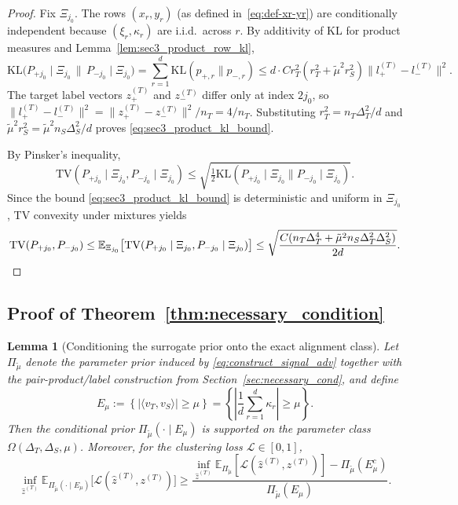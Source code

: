 \documentclass[10pt]{article}
\newtheorem{lemma}{Lemma}
\newcommand{\Ebb}{\mathbb E}
\newcommand{\ip}[2]{\langle #1,#2\rangle}
\newcommand{\wh}{\widehat}
\newcommand{\calL}{\mathcal L}
\newcommand{\KL}{\mathrm{KL}}
\newcommand{\TV}{\mathrm{TV}}
\newcommand{\trg}{T}
\newcommand{\nT}{n_{\trg}}
\newcommand{\ztar}{z^{(\trg)}}
\newcommand{\hatztar}{\wh{z}^{(\trg)}}
\newcommand{\DeltaT}{\Delta_{\trg}}
\newcommand{\src}{S}
\newcommand{\nS}{n_{\src}}
\newcommand{\DeltaS}{\Delta_{\src}}
\begin{document}
\begin{proof}
Fix $\Xi_{j_0}$.  The rows $(x_r,y_r)$ (as defined in~\eqref{eq:def-xr-yr}) are conditionally independent because
$(\xi_r,\kappa_r)$ are i.i.d.\ across $r$.  By additivity of KL for product
measures and Lemma~\ref{lem:sec3_product_row_kl},
\[
    \KL\!\bigl(P_{+j_0}\mid\Xi_{j_0}\,\big\|\,P_{-j_0}\mid\Xi_{j_0}\bigr)
    =
    \sum_{r=1}^d \KL(p_{+,r}\|p_{-,r})
    \le
    d\cdot Cr_T^2(r_T^2+\tilde\mu^2 r_S^2)\|l^{(\trg)}_+-l^{(\trg)}_-\|^2.
\]
The target label vectors $\ztar_+$ and $\ztar_-$ differ only at index $2j_0$,
so $\|l^{(\trg)}_+-l^{(\trg)}_-\|^2=\|\ztar_+-\ztar_-\|^2/\nT=4/\nT$.  Substituting
$r_T^2=\nT\DeltaT^2/d$ and $\tilde\mu^2 r_S^2=\tilde\mu^2\nS\DeltaS^2/d$
proves \eqref{eq:sec3_product_kl_bound}.

By Pinsker's inequality,
\[
    \TV(P_{+j_0}\mid\Xi_{j_0},P_{-j_0}\mid\Xi_{j_0})
    \le
    \sqrt{\tfrac12\KL(P_{+j_0}\mid\Xi_{j_0}\|P_{-j_0}\mid\Xi_{j_0})}.
\]
Since the bound \eqref{eq:sec3_product_kl_bound} is deterministic and uniform
in $\Xi_{j_0}$, TV convexity under mixtures yields
\[
    \TV(P_{+j_0},P_{-j_0})
    \le
    \Ebb_{\Xi_{j_0}}\bigl[\TV(P_{+j_0}\mid\Xi_{j_0},P_{-j_0}\mid\Xi_{j_0})\bigr]
    \le
    \sqrt{\frac{C(\nT\DeltaT^4+\tilde\mu^2\nS\DeltaT^2\DeltaS^2)}{2d}}.
    \qedhere
\]
\end{proof}



\subsection{Proof of Theorem~\ref{thm:necessary_condition}}
\label{app:proof-necessary-cond}

\begin{lemma}[Conditioning the surrogate prior onto the exact alignment class]
\label{lem:sec3_conditioning}
Let $\Pi_{\tilde\mu}$ denote the parameter prior induced by
\eqref{eq:construct_signal_adv} together with the pair-product/label
construction from Section~\ref{sec:necessary_cond}, and define
\[
    E_\mu
    :=
    \left\{|\ip{v_{\trg}}{v_{\src}}|\ge\mu\right\}
    =
    \left\{\left|\frac{1}{d}\sum_{r=1}^d \kappa_r\right|\ge\mu\right\}.
\]
Then the conditional prior $\Pi_{\tilde\mu}(\cdot\mid E_\mu)$ is supported on
the parameter class $\Omega(\DeltaT,\DeltaS,\mu)$. Moreover, for the clustering
loss $\calL\in[0,1]$,
\[
    \inf_{\hatztar}\Ebb_{\Pi_{\tilde\mu}(\cdot\mid E_\mu)}
    \bigl[\calL(\hatztar,\ztar)\bigr]
    \ge
    \frac{
        \inf_{\hatztar}\Ebb_{\Pi_{\tilde\mu}}[\calL(\hatztar,\ztar)]
        -
        \Pi_{\tilde\mu}(E_\mu^c)
    }{
        \Pi_{\tilde\mu}(E_\mu)
    }.
\]
\end{lemma}
\end{document}
